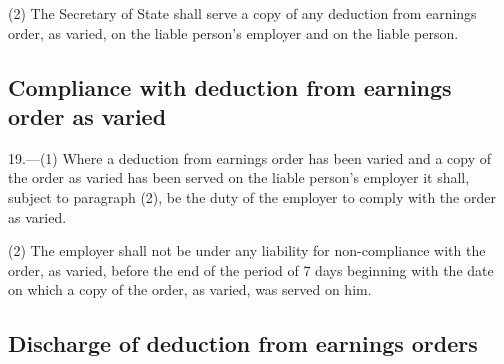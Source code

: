 \documentclass[12pt,a4paper]{article}
\begin{document}
(2) The Secretary of State shall serve a copy of any deduction from earnings order, as varied, on the liable person’s employer and on the liable person.

\subsection[19. Compliance with deduction from earnings order as varied]{Compliance with deduction from earnings order as varied}

19.—(1) Where a deduction from earnings order has been varied and a copy of the order as varied has been served on the liable person’s employer it shall, subject to paragraph (2), be the duty of the employer to comply with the order as varied.

(2) The employer shall not be under any liability for non-compliance with the order, as varied, before the end of the period of 7 days beginning with the date on which a copy of the order, as varied, was served on him.

\subsection[20. Discharge of deduction from earnings orders]{Discharge of deduction from earnings orders}
\end{document}
